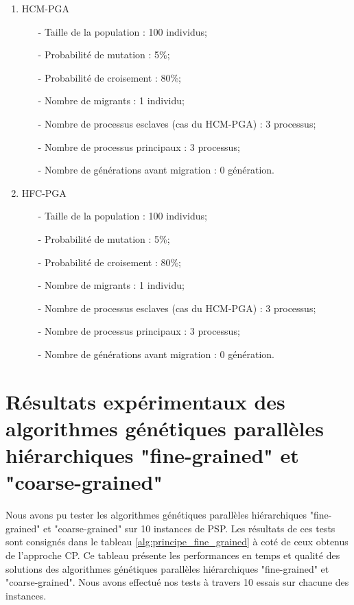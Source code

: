 \documentclass[12pt,a4paper]{article}
\begin{document}
		\begin{enumerate}
			\item HCM-PGA \\
				\begin{itemize}
					\item[-] Taille de la population : 100 individus;
			        \item[-] Probabilité de mutation : 5\%;
			        \item[-] Probabilité de croisement : 80\%;
			        \item[-] Nombre de migrants : 1 individu;
		 	        \item[-] Nombre de processus esclaves (cas du HCM-PGA) : 3 processus;
			        \item[-] Nombre de processus principaux : 3 processus;
			        \item[-] Nombre de générations avant migration : 0 génération.
				\end{itemize}
				\vspace*{.5cm}
			\item HFC-PGA \\
				\begin{itemize}
					\item[-] Taille de la population : 100 individus;
			        \item[-] Probabilité de mutation : 5\%;
			        \item[-] Probabilité de croisement : 80\%;
			        \item[-] Nombre de migrants : 1 individu;
		 	        \item[-] Nombre de processus esclaves (cas du HCM-PGA) : 3 processus;
			        \item[-] Nombre de processus principaux : 3 processus;
			        \item[-] Nombre de générations avant migration : 0 génération.
				\end{itemize}
		\end{enumerate}
		
		\section{Résultats expérimentaux des algorithmes génétiques parallèles hiérarchiques "fine-grained" et "coarse-grained"}
		Nous avons pu tester les algorithmes génétiques parallèles hiérarchiques "fine-grained" et "coarse-grained" sur 10 instances de PSP. Les résultats de ces tests sont consignés dans le tableau \ref{alg:principe_fine_grained} à coté de ceux obtenus de l'approche CP. Ce tableau présente les performances en temps et qualité des solutions des algorithmes génétiques parallèles hiérarchiques "fine-grained" et "coarse-grained". Nous avons effectué nos tests à travers 10 essais sur chacune des instances.
		
\end{document}
